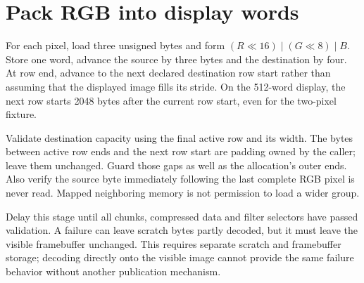 \section{Pack RGB into display words}
For each pixel, load three unsigned bytes and form
$(R\ll16)\mathbin{|}(G\ll8)\mathbin{|}B$. Store one word, advance the source by
three bytes and the destination by four. At row end, advance to the next declared
destination row start rather than assuming that the displayed image fills its stride.
On the 512-word display, the next row starts 2048 bytes after the current row start,
even for the two-pixel fixture.

Validate destination capacity using the final active row and its width. The bytes
between active row ends and the next row start are padding owned by the caller;
leave them unchanged. Guard those gaps as well as the allocation's outer ends.
Also verify the source byte immediately following the last complete RGB pixel is
never read. Mapped neighboring memory is not permission to load a wider group.

Delay this stage until all chunks, compressed data and filter selectors have passed
validation. A failure can leave scratch bytes partly decoded, but it must leave the
visible framebuffer unchanged. This requires separate scratch and framebuffer storage;
decoding directly onto the visible image cannot provide the same failure behavior
without another publication mechanism.
